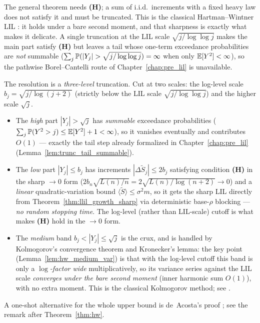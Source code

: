 The general theorem needs \textbf{(H)}; a sum of i.i.d.\ increments with a fixed heavy
law does not satisfy it and must be truncated. This is the classical Hartman--Wintner
LIL \cite{HartmanWintner1941}: it holds under a bare second moment, and that sharpness
is exactly what makes it delicate. A single truncation at the LIL scale
$\sqrt{j/\log\log j}$ makes the main part satisfy \textbf{(H)} but leaves a tail whose
one-term exceedance probabilities are \emph{not} summable ($\sum_j\Prob(|Y_j|>
\sqrt{j/\log\log j})=\infty$ when only $\mathbb{E}[Y^2]<\infty$), so the pathwise
Borel--Cantelli route of Chapter~\ref{chap:pre_lil} is unavailable.

The resolution is a \emph{three-level} truncation. Cut at two scales: the log-level scale
$b_j=\sqrt{j/\log(j+2)}$ (strictly below the LIL scale $\sqrt{j/\log\log j}$) and the
higher scale $\sqrt j$.
\begin{itemize}
  \item The \emph{high} part $|Y_j|>\sqrt j$ has \emph{summable} exceedance
        probabilities ($\sum_j\mathbb{P}(Y^2>j)\le\mathbb{E}[Y^2]+1<\infty$), so it vanishes
        eventually and contributes $O(1)$ --- exactly the tail step already formalized
        in Chapter~\ref{chap:pre_lil} (Lemma~\ref{lem:trunc_tail_summable}).
  \item The \emph{low} part $|Y_j|\le b_j$ has increments $|\Delta\tilde S_j|\le2b_j$
        satisfying condition \textbf{(H)} in the sharp $\to0$ form
        ($2b_n\sqrt{L(n)/n}=2\sqrt{L(n)/\log(n+2)}\to0$) and a \emph{linear}
        quadratic-variation bound $\langle\tilde S\rangle\le\sigma^2 m$, so it gets the
        sharp LIL directly from Theorem~\ref{thm:llil_growth_sharp} via deterministic
        base-$\rho$ blocking --- \emph{no random stopping time}. The log-level (rather than
        LIL-scale) cutoff is what makes \textbf{(H)} hold in the $\to0$ form.
  \item The \emph{medium} band $b_j<|Y_j|\le\sqrt j$ is the crux, and is handled by
        Kolmogorov's convergence theorem and Kronecker's lemma: the key point
        (Lemma~\ref{lem:hw_medium_var}) is that with the log-level cutoff this band is only
        a \emph{$\log$-factor wide} multiplicatively, so its variance series against
        the LIL scale \emph{converges under the bare second moment} (inner harmonic sum
        $O(1)$), with no extra moment. This is the classical Kolmogorov method; see
        \cite{Stout1974,heyde1980}.
\end{itemize}
A one-shot alternative for the whole upper bound is de~Acosta's proof
\cite{deAcosta1983}; see the remark after Theorem~\ref{thm:hw}.

